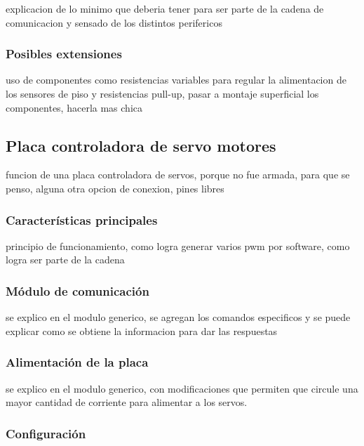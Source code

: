 explicacion de lo minimo que deberia tener para ser parte de la cadena de comunicacion y sensado de los distintos perifericos

\subsubsection{Posibles extensiones}
\label{h_placas_sensado_extensiones}

uso de componentes como resistencias variables para regular la alimentacion de los sensores de piso y resistencias pull-up, pasar a montaje superficial los componentes, hacerla mas chica

\subsection{Placa controladora de servo motores}
\label{h_placas_servos}

funcion de una placa controladora de servos, porque no fue armada, para que se penso, alguna otra opcion de conexion, pines libres

\subsubsection{Caracter\'isticas principales}
\label{h_placas_servos_caracteristicas}

principio de funcionamiento, como logra generar varios pwm por software, como logra ser parte de la cadena

\subsubsection{M\'odulo de comunicaci\'on}
\label{h_placas_servos_comm}

se explico en el modulo generico, se agregan los comandos especificos y se puede explicar como se obtiene la informacion para dar las respuestas

\subsubsection{Alimentaci\'on de la placa}
\label{h_placas_servos_alimentacion}

se explico en el modulo generico, con modificaciones que permiten que circule una mayor cantidad de corriente para alimentar a los servos.

\subsubsection{Configuraci\'on}
\label{h_placas_servos_config}

